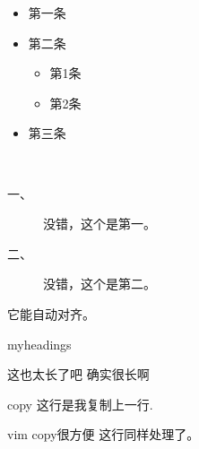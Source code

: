 \documentclass{scrartcl}
\begin{document}
\begin{CJK}{UTF8}{gbsn}
\begin{minipage}[h]{0.4\linewidth}
\begin{flushleft}
\begin{itemize}
	\item 第一条
	\item 第二条
		\begin{itemize}
			\item 第1条
			\item 第2条
		\end{itemize}
	\item 第三条
\end{itemize}

\end{flushleft}
\end{minipage}
\begin{minipage}[h]{0.5\linewidth}
\begin{flushright}

~\\
\begin{description}
	\item[一、] 没错，这个是第一。
	\item[二、] 没错，这个是第二。
\end{description}

它能自动对齐。\\
\begin{labeling}[~~---~]{myheadings}
	\item[\usekomafont{descriptionlabel}这也太长了吧]
		确实很长啊
	\item[\usekomafont{descriptionlabel}copy]
		这行是我复制上一行.
	\item[\usekomafont{descriptionlabel}vim copy很方便]
		这行同样处理了。
\end{labeling}

\end{flushright}
\end{minipage}


\clearpage\end{CJK}
\end{document}
